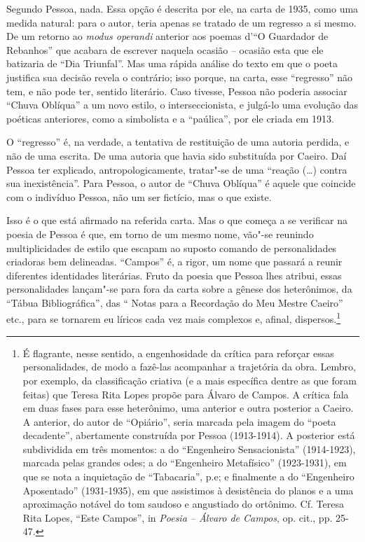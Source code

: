 Segundo Pessoa, nada. Essa opção é descrita por ele, na carta de 1935,
como uma medida natural: para o autor, teria apenas se tratado de um
regresso a si mesmo. De um retorno ao \emph{modus operandi} anterior aos
poemas d'``O Guardador de Rebanhos'' que acabara de escrever naquela
ocasião -- ocasião esta que ele batizaria de ``Dia Triunfal''. Mas uma
rápida análise do texto em que o poeta justifica sua decisão revela o
contrário; isso porque, na carta, esse ``regresso'' não tem, e não pode
ter, sentido literário. Caso tivesse, Pessoa não poderia associar
``Chuva Oblíqua'' a um novo estilo, o interseccionista, e julgá-lo uma
evolução das poéticas anteriores, como a simbolista e a ``paúlica'', por
ele criada em 1913.

O ``regresso'' é, na verdade, a tentativa de restituição de uma autoria
perdida, e não de uma escrita. De uma autoria que havia sido substituída
por Caeiro. Daí Pessoa ter explicado, antropologicamente, tratar"-se de
uma ``reação (\ldots{}) contra sua inexistência''. Para Pessoa, o autor de
``Chuva Oblíqua'' é aquele que coincide com o indivíduo Pessoa, não um
ser fictício, mas o que existe.

Isso é o que está afirmado na referida carta. Mas o que começa a se
verificar na poesia de Pessoa é que, em torno de um mesmo nome, vão"-se
reunindo multiplicidades de estilo que escapam ao suposto comando de
personalidades criadoras bem delineadas. ``Campos'' é, a rigor, um nome
que passará a reunir diferentes identidades literárias. Fruto da poesia
que Pessoa lhes atribui, essas personalidades lançam"-se para fora da
carta sobre a gênese dos heterônimos, da ``Tábua Bibliográfica'', das ``
Notas para a Recordação do Meu Mestre Caeiro'' etc., para se tornarem eu
líricos cada vez mais complexos e, afinal, dispersos.\footnote{É
  flagrante, nesse sentido, a engenhosidade da crítica para reforçar
  essas personalidades, de modo a fazê-las acompanhar a trajetória da
  obra. Lembro, por exemplo, da classificação criativa (e a mais
  específica dentre as que foram feitas) que Teresa Rita Lopes propõe
  para Álvaro de Campos. A crítica fala em duas fases para esse
  heterônimo, uma anterior e outra posterior a Caeiro. A anterior, do
  autor de ``Opiário'', seria marcada pela imagem do ``poeta
  decadente'', abertamente construída por Pessoa (1913-1914). A
  posterior está subdividida em três momentos: a do ``Engenheiro
  Sensacionista'' (1914-1923), marcada pelas grandes odes; a do
  ``Engenheiro Metafísico'' (1923-1931), em que se nota a inquietação de
  ``Tabacaria'', p.e; e finalmente a do ``Engenheiro Aposentado''
  (1931-1935), em que assistimos à desistência do planos e a uma
  aproximação notável do tom saudoso e angustiado do ortônimo. Cf.
  Teresa Rita Lopes, ``Este Campos'', in \emph{Poesia -- Álvaro de
  Campos}, op. cit., pp. 25-47.}

